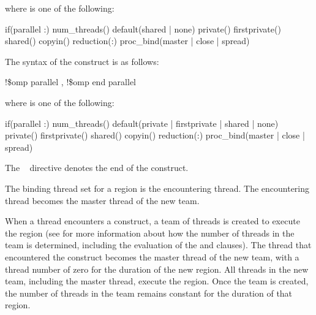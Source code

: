 where  is one of the following:

\begin{indentedcodelist}
if(\plc{[}parallel :\plc{] scalar-expression})
num\_threads()
default(shared \textnormal{|} none)
private()
firstprivate()
shared()
copyin()
reduction(:)
proc\_bind(master \textnormal{|} close \textnormal{|} spread)
\end{indentedcodelist}
\ccppspecificend

\fortranspecificstart
The syntax of the  construct is as follows:

\begin{boxedcode}
!\$omp parallel \plc{[clause[ [},\plc{] clause] ... ]}
!\$omp end parallel
\end{boxedcode}

\begin{samepage}
where  is one of the following:

\begin{indentedcodelist}
if(\plc{[}parallel :\plc{] scalar-logical-expression})
num\_threads()
default(private \textnormal{|} firstprivate \textnormal{|} shared \textnormal{|} none)
private()
firstprivate()
shared()
copyin()
reduction(:)
proc\_bind(master \textnormal{|} close \textnormal{|} spread)
\end{indentedcodelist}
\end{samepage}

The ~ directive denotes the end of the  construct.
\fortranspecificend

\binding
The binding thread set for a  region is the encountering thread. The 
encountering thread becomes the master thread of the new team.

\descr
When a thread encounters a  construct, a team of threads is created to 
execute the  region (see 
for more information about 
how the number of threads in the team is determined, including the evaluation of the 
and  clauses). The thread that encountered the  construct 
becomes the master thread of the new team, with a thread number of zero for the 
duration of the new  region. All threads in the new team, including the 
master thread, execute the region. Once the team is created, the number of threads in the 
team remains constant for the duration of that  region.

